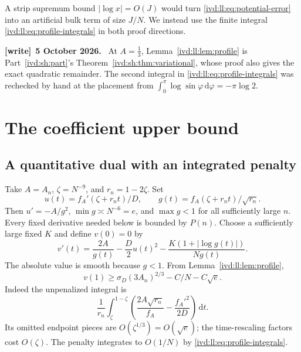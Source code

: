 \documentclass[11pt,letterpaper]{article}
\theoremstyle{remark}\newtheorem{remark}[theorem]{Remark}
\numberwithin{equation}{section}
\newcommand{\dd}{\,\mathrm d}
\newenvironment{writenote}[1][]{\par\smallskip\begingroup\small
 \noindent\textbf{[write]}\if\relax\detokenize{#1}\relax\else~\textbf{#1.}\fi\ }%
 {\par\endgroup\smallskip}
\begin{document}
A strip supremum bound $|\log x|=O(J)$ would turn
\eqref{ivd:ll:eq:potential-error} into an artificial bulk term of size
$J/N$. We instead use the finite integral
\eqref{ivd:ll:eq:profile-integrals} in both proof directions.
\begin{writenote}[5 October 2026]
At $A=\frac13$, Lemma~\ref{ivd:ll:lem:profile} is Part~\ref{ivd:sh:part}'s Theorem~\ref{ivd:sh:thm:variational}, whose proof also gives the exact quadratic remainder. The second integral in \eqref{ivd:ll:eq:profile-integrals} was rechecked by hand at the placement from $\int_0^\pi\log\sin\varphi\dd\varphi=-\pi\log2$.
\end{writenote}

\section{The coefficient upper bound}\label{ivd:ll:sec:upper}
\subsection{A quantitative dual with an integrated penalty}
Take $A=A_n$, $\zeta=N^{-9}$, and $r_n=1-2\zeta$. Set
\[
 u(t)=f_A'(\zeta+r_nt)/D,\qquad
 g(t)=f_A(\zeta+r_nt)/\sqrt{r_n}.
\]
Then $u'=-A/g^2$, $\min g\asymp N^{-6}=e$, and
$\max g<1$ for all sufficiently large $n$. Every fixed derivative
needed below is bounded by $P(n)$. Choose a sufficiently large fixed
$K$ and define $v(0)=0$ by
\begin{equation}\label{ivd:ll:eq:dual-v}
 v'(t)=\frac{2A}{g(t)}-\frac D2u(t)^2
       -\frac{K(1+|\log g(t)|)}{N g(t)}.
\end{equation}
The absolute value is smooth because $g<1$. From
Lemma~\ref{ivd:ll:lem:profile},
\begin{equation}\label{ivd:ll:eq:dual-value}
 v(1)\ge\sigma_D(3A_n)^{2/3}-C/N-C\sqrt e.
\end{equation}
Indeed the unpenalized integral is
\[
 \frac1{r_n}\int_\zeta^{1-\zeta}
 \left(\frac{2A\sqrt{r_n}}{f_A}-\frac{f_A'^2}{2D}\right)\dd t.
\]
Its omitted endpoint pieces are $O(\zeta^{1/3})=O(\sqrt e)$;
the time-rescaling factors cost $O(\zeta)$.
The penalty integrates to $O(1/N)$ by
\eqref{ivd:ll:eq:profile-integrals}.
\end{document}
